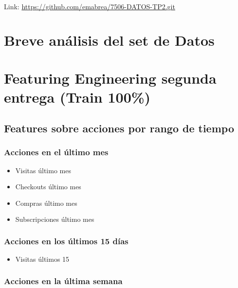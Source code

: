 \documentclass[a4paper ,12pt]{article}
\begin{document}
Link: \url{https://github.com/emabrea/7506-DATOS-TP2.git}

\newpage
\section{Breve análisis del set de Datos}





\newpage
\section{Featuring Engineering segunda entrega (Train 100\%)}

\subsection{ Features sobre acciones por rango de tiempo }

		
		\subsubsection{Acciones en el último mes}
	
		\begin{itemize}
		 	
		\item Visitas último mes
		
		\item Checkouts último mes
		
		\item Compras último mes
		
		\item Subscripciones último mes
		\end{itemize}
		
	
		

		\subsubsection{Acciones en los últimos 15 días}		
		
		\begin{itemize}
			\item 	Visitas últimos 15
		\end{itemize}
		


		\subsubsection{Acciones en la última semana}
			
\end{document}
